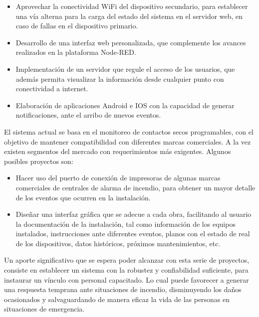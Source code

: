\begin{itemize}
\item Aprovechar la conectividad WiFi del dispositivo secundario, para establecer una vía alterna para la carga del estado del sistema en el servidor web, en caso de fallas en el dispositivo primario.
\item Desarrollo de una interfaz web personalizada, que complemente los avances realizados en la plataforma Node-RED. 
\item Implementación de un servidor que regule el acceso de los usuarios, que además permita visualizar la información desde cualquier punto con conectividad a internet.
\item Elaboración de aplicaciones Android e IOS con la capacidad de generar notificaciones, ante el arribo de nuevos eventos. 
\end{itemize}

El sistema actual se basa en el monitoreo de contactos secos programables, con el objetivo de mantener compatibilidad con diferentes marcas comerciales. A la vez existen segmentos del mercado con requerimientos más exigentes. Algunos posibles proyectos son:


\begin{itemize}
\item Hacer uso del puerto de conexión de impresoras de algunas marcas comerciales de centrales de alarma de incendio, para obtener un mayor detalle de los eventos que ocurren en la instalación.
\item Diseñar una interfaz gráfica que se adecue a cada obra, facilitando al usuario la documentación de la instalación, tal como información de los equipos instalados, instrucciones ante diferentes eventos, planos con el estado de real de los dispositivos, datos históricos, próximos mantenimientos, etc.
\end{itemize}

Un aporte significativo que se espera poder alcanzar con esta serie de proyectos, consiste en establecer un sistema con la robustez y confiabilidad suficiente, para instaurar un vínculo con personal capacitado. Lo cual puede favorecer a generar una respuesta temprana ante situaciones de incendio, disminuyendo los daños ocasionados y salvaguardando de manera eficaz la vida de las personas en situaciones de emergencia. 
